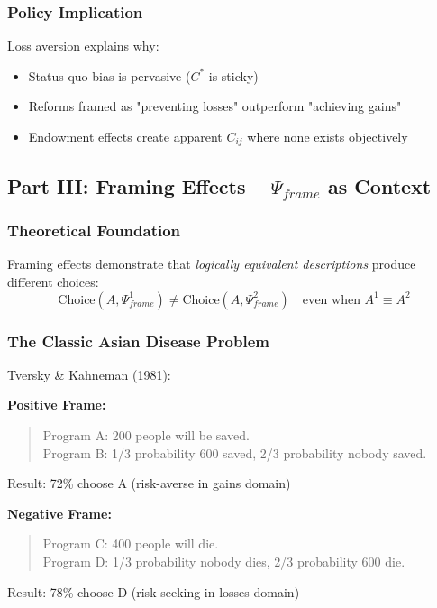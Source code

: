 \subsubsection{Policy Implication}

Loss aversion explains why:
\begin{itemize}
    \item Status quo bias is pervasive ($C^*$ is sticky)
    \item Reforms framed as "preventing losses" outperform "achieving gains"
    \item Endowment effects create apparent $C_{ij}$ where none exists objectively
\end{itemize}

\subsection{Part III: Framing Effects – $\Psi_{frame}$ as Context}

\subsubsection{Theoretical Foundation}

Framing effects demonstrate that \textit{logically equivalent descriptions} 
produce different choices:
\begin{equation}
\boxed{
\text{Choice}(A, \Psi_{frame}^1) \neq \text{Choice}(A, \Psi_{frame}^2) 
\quad \text{even when } A^1 \equiv A^2
}
\label{eq:kt-framing}
\end{equation}

\subsubsection{The Classic Asian Disease Problem}

Tversky \& Kahneman (1981):

\textbf{Positive Frame:}
\begin{quote}
Program A: 200 people will be saved. \\
Program B: 1/3 probability 600 saved, 2/3 probability nobody saved.
\end{quote}
Result: 72\% choose A (risk-averse in gains domain)

\textbf{Negative Frame:}
\begin{quote}
Program C: 400 people will die. \\
Program D: 1/3 probability nobody dies, 2/3 probability 600 die.
\end{quote}
Result: 78\% choose D (risk-seeking in losses domain)

